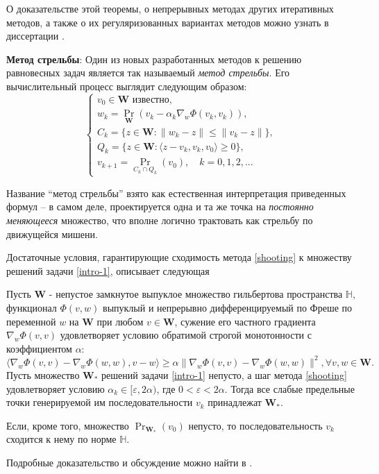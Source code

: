 О доказательстве этой теоремы, о непрерывных методах других итеративных методов, а также о их регуляризованных вариантах методов можно узнать в диссертации \cite{10}. 

\textbf{Метод стрельбы}: Один из новых разработанных методов к решению равновесных задач является так называемый \textit{метод стрельбы}. Его вычислительный процесс выглядит следующим образом:
\begin{equation}
\label{shooting}
\left\{\begin{array}{l}
v_0\in \mathbf{W}\text{ известно},\\
w_k = \operatorname{Pr}_{\mathbf{W}}(v_k-\alpha_k\nabla_w\Phi(v_k,v_k)),\\
C_k = \{z\in \mathbf{W}:\|w_k-z\|\leqslant\|v_k-z\|\},\\
Q_k=\{z\in\mathbf{W}:\langle z-v_k,v_k,v_0\rangle\geqslant 0 \},\\
v_{k+1} = \operatorname{Pr}_{C_k\cap Q_k}(v_0),\quad k=0,1,2,...
\end{array}
\right.
\end{equation}

Название ``метод стрельбы'' взято как естественная интерпретация приведенных формул – в самом деле, проектируется одна и та же точка на \textit{постоянно меняющееся} множество, что вполне логично трактовать как стрельбу по движущейся мишени.

Достаточные условия, гарантирующие сходимость метода \eqref{shooting} к множеству решений задачи \eqref{intro-1}, описывает
следующая
\begin{theo}
Пусть $\mathbf{W}$ - непустое замкнутое выпуклое множество гильбертова пространства $\mathbb{H}$, функционал $\Phi(v, w)$ выпуклый и непрерывно дифференцируемый по Фреше по переменной $w$ на $\mathbf{W}$ при любом $v\in\mathbf{W}$, сужение его частного градиента $\nabla_w\Phi(v, v)$ удовлетворяет условию обратимой строгой монотонности с коэффициентом $\alpha$:
\begin{equation*}
\langle \nabla_w\Phi(v,v)-\nabla_w\Phi(w,w),v-w\rangle\geqslant \alpha\|\nabla_w\Phi(v,v)-\nabla_w\Phi(w,w)\|^2,\forall v,w\in\mathbf{W}.
\end{equation*}
Пусть множество $\mathbf{W_{*}}$ решений задачи \eqref{intro-1} непусто, а шаг метода \eqref{shooting} удовлетворяет условию
$\alpha_k\in[\varepsilon, 2\alpha)$, где $0 < \varepsilon< 2\alpha$. Тогда все слабые предельные точки генерируемой им последовательности $v_k$ принадлежат $\mathbf{W_{*}}$. 

Если, кроме того, множество $\operatorname{Pr}_{\mathbf{W_{*}}}(v_0)$ непусто, то последовательность $v_k$ сходится к нему по норме $\mathbb{H}$.
\end{theo}
Подробные доказательство и обсуждение можно найти в \cite{10-2}.

